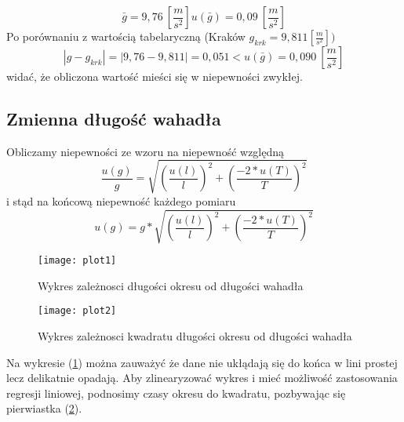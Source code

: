 \documentclass[a4paper,10pt,twoside]{article}
\begin{document}
\begin{subequations}
\begin{equation}
\bar{g} = 9,76~\left[\frac{m}{s^2}\right]
\end{equation}
\begin{equation}
u(\bar{g}) = 0,09~\left[\frac{m}{s^2}\right]
\end{equation}
\end{subequations}
Po porównaniu z wartością tabelaryczną (Kraków $g_{krk}=9,811\left[\frac{m}{s^2}\right])$
\begin{equation}
\left| g-g_{krk} \right| = \left| 9,76-9,811 \right| = 0,051 < u(\bar{g}) = 0,090~\left[\frac{m}{s^2}\right]
\end{equation}
widać, że obliczona wartość mieści się w niepewności zwykłej.

\subsection{Zmienna długość wahadła}
\noindent
Obliczamy niepewności ze wzoru na niepewność względną
\begin{equation}
\frac{u(g)}{g} = \sqrt{\left(\frac{u(l)}{l}\right)^2 + \left(\frac{-2*u(T)}{T}\right)^2}
\end{equation}
i stąd na końcową niepewność każdego pomiaru
\begin{equation}
u(g) = g*\sqrt{\left(\frac{u(l)}{l}\right)^2 + \left(\frac{-2*u(T)}{T}\right)^2}
\end{equation}
\begin{figure}[!htp]
\centerline{\texttt{[image: plot1]}}
\caption{Wykres zależnosci długości okresu od długości wahadła}
\label{fig:tl}
\end{figure}
\begin{figure}[!htp]
\centerline{\texttt{[image: plot2]}}
\caption{Wykres zależnosci kwadratu długości okresu od długości wahadła}
\label{fig:ttl}
\end{figure}
\newpage
Na wykresie (\ref{fig:tl}) można zauważyć że dane nie ukłądają się do końca w lini prostej lecz delikatnie opadają.
Aby zlinearyzować wykres i mieć możliwość zastosowania regresji liniowej, podnosimy czasy okresu do kwadratu, pozbywając się
pierwiastka (\ref{fig:ttl}).
\end{document}
